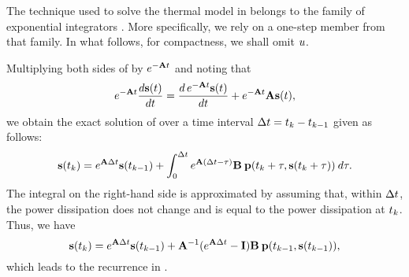 The technique used to solve the thermal model in  belongs to the family of exponential integrators \cite{hochbruck2010}.
More specifically, we rely on a one-step member from that family.
In what follows, for compactness, we shall omit $u$.

Multiplying both sides of  by $e^{- \mathbf{A} t}$ and noting that
\[
  e^{-\mathbf{A} t} \frac{d\mathbf{s}(t)}{dt} = \frac{d\, e^{-\mathbf{A} t} \mathbf{s}(t)}{dt} + e^{-\mathbf{A} t} \mathbf{A} \mathbf{s}(t),
\]
we obtain the exact solution of  over a time interval $\Delta t = t_k - t_{k - 1}$ given as follows:
\[
  \mathbf{s}(t_k) = e^{\mathbf{A} \Delta t} \mathbf{s}(t_{k - 1}) + \int_0^{\Delta t} e^{\mathbf{A} (\Delta t - \tau)} \mathbf{B} \: \mathbf{p}(t_k + \tau, \mathbf{s}(t_k + \tau)) \: d\tau.
\]
The integral on the right-hand side is approximated by assuming that, within $\Delta t$, the power dissipation does not change and is equal to the power dissipation at $t_k$.
Thus, we have
\[
  \mathbf{s}(t_k) = e^{\mathbf{A} \Delta t} \mathbf{s}(t_{k - 1}) + \mathbf{A}^{-1}(e^{\mathbf{A} \Delta t} - \mathbf{I}) \mathbf{B} \: \mathbf{p}(t_{k - 1}, \mathbf{s}(t_{k - 1})),
\]
which leads to the recurrence in .
